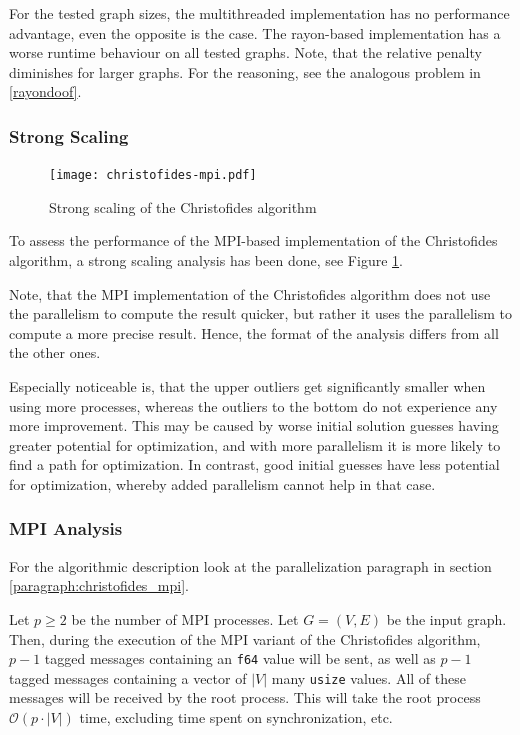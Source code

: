 For the tested graph sizes, the multithreaded implementation
has no performance advantage, even the opposite is the case.
The rayon-based implementation has a worse runtime behaviour on all
tested graphs. Note, that the relative penalty diminishes
for larger graphs. For the reasoning, see the analogous problem in \ref{rayondoof}.

\subsubsection{Strong Scaling}

\begin{figure}[H]
  \centering
  \texttt{[image: christofides-mpi.pdf]}
  \caption{Strong scaling of the Christofides algorithm}
  \label{fig:strong_scaling_christofides}
\end{figure}

To assess the performance of the \ac{MPI}-based implementation of the Christofides algorithm,
a strong scaling analysis has been done, see Figure \ref{fig:strong_scaling_christofides}.

Note, that the \ac{MPI} implementation of the Christofides algorithm does not
use the parallelism to compute the result quicker, but rather
it uses the parallelism to compute a more precise result.
Hence, the format of the analysis differs from all the other ones.

Especially noticeable is, that the upper outliers get significantly smaller when 
using more processes, whereas the outliers to the bottom do not experience any more improvement.
This may be caused by worse initial solution guesses having greater potential for optimization,
and with more parallelism it is more likely to find a path for optimization.
In contrast, good initial guesses have less potential for optimization,
whereby added parallelism cannot help in that case.


\subsubsection{MPI Analysis}
For the algorithmic description look at 
the parallelization paragraph in section
\ref{paragraph:christofides_mpi}.

Let $p \geq 2$ be the number of \ac{MPI} processes.
Let $G = (V,E)$ be the input graph.
Then, during the execution of the \ac{MPI} variant of the Christofides algorithm,
$p-1$ tagged messages containing an \texttt{f64} value will be sent,
as well as $p-1$ tagged messages containing a vector of $|V| $ many \texttt{usize} values.
All of these messages will be received by the root process.
This will take the root process $\mathcal{O}(p \cdot |V|)$ time,
excluding time spent on synchronization, etc.

